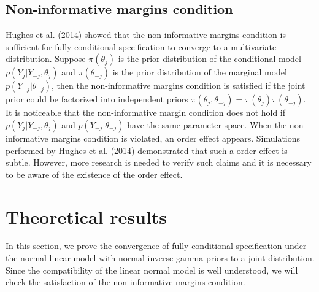\documentclass[12pt, fullpage, a4paper]{article}
\begin{document}
\subsection{Non-informative margins condition}
Hughes et al. (2014) showed that the non-informative margins condition is sufficient for fully conditional specification to converge to a multivariate distribution. Suppose $\pi(\theta_{j})$ is the prior distribution of the conditional model $p(Y_j|Y_{-j}, \theta_{j})$ and $\pi(\theta_{-j})$ is the prior distribution of the marginal model $p(Y_{-j}|\theta_{-j})$, then the non-informative margins condition is satisfied if the joint prior could be factorized into independent priors $\pi(\theta_{j}, \theta_{-j}) = \pi(\theta_{j})\pi(\theta_{-j})$. It is noticeable that the non-informative margin condition does not hold if $p(Y_j|Y_{-j}, \theta_{j})$ and $p(Y_{-j}|\theta_{-j})$ have the same parameter space. When the non-informative margins condition is violated, an order effect appears. Simulations performed by Hughes et al. (2014) demonstrated that such a order effect is subtle. However, more research is needed to verify such claims and it is necessary to be aware of the existence of the order effect. 

\section{Theoretical results}
In this section, we prove the convergence of fully conditional specification under the normal linear model with normal inverse-gamma priors to a joint distribution. Since the compatibility of the linear normal model is well understood,  we will check the satisfaction of the non-informative margins condition. 
\end{document}
